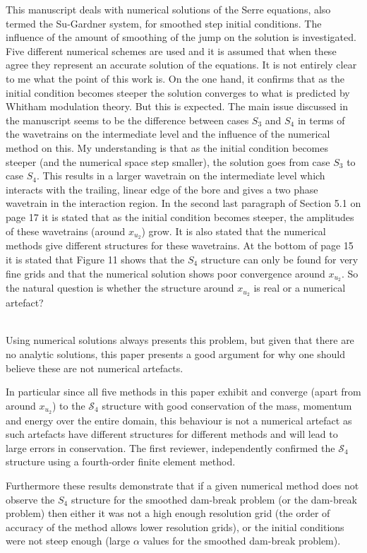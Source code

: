 \documentclass[times]{article}
\begin{document}
	This manuscript deals with numerical solutions of the Serre equations, also termed the	Su-Gardner system, for smoothed step initial conditions. The influence of the amount of smoothing of the jump on the solution is investigated. Five different numerical schemes are used and it is assumed that when these agree they represent an accurate solution of the
	equations. It is not entirely clear to me what the point of this work is. On the one hand, it confirms that as the initial condition becomes steeper the solution converges to what is predicted by Whitham modulation theory. But this is expected. The main issue discussed in	the manuscript seems to be the difference between cases $S_3$ and $S_4$ in terms of the wavetrains on the intermediate level and the influence of the numerical method on this. 	My understanding is that as the initial condition becomes steeper (and the numerical space step smaller), the solution goes from case $S_3$ to case $S_4$. This results in a larger wavetrain
	on the intermediate level which interacts with the trailing, linear edge of the bore and gives a two phase wavetrain in the interaction region. In the second last paragraph of Section 5.1 on page 17 it is stated that as the initial condition becomes steeper, the amplitudes of these wavetrains (around $x_{u_2}$) grow. It is also stated that the numerical methods give different structures for these wavetrains. At the bottom of page 15 it is stated that Figure 11 shows
	that the $S_4$ structure can only be found for very fine grids and that the numerical solution shows poor convergence around $x_{u_2}$. So the natural question is whether the structure around	$x_{u_2}$ is real or a numerical artefact?
	\\ \\
	{\color{blue} Using numerical solutions always presents this problem, but given that there are no analytic solutions, this paper presents a good argument for why one should believe these are not numerical artefacts.
		
	In particular since all five methods in this paper exhibit and converge (apart from around $x_{u_2}$) to the $\mathcal{S}_4$ structure with good conservation of the mass, momentum and energy over the entire domain, this behaviour is not a numerical artefact as such artefacts have different structures for different methods and will lead to large errors in conservation. The first reviewer, independently confirmed the $\mathcal{S}_4$ structure using a fourth-order finite element method.
	
	Furthermore these results demonstrate that if a given numerical method does not observe the $S_4$ structure for the smoothed dam-break problem (or the dam-break problem) then either it was not a high enough resolution grid (the order of accuracy of the method allows lower resolution grids), or the initial conditions were not steep enough (large $\alpha$ values for the smoothed dam-break problem). } \\ \\
	
\end{document}
